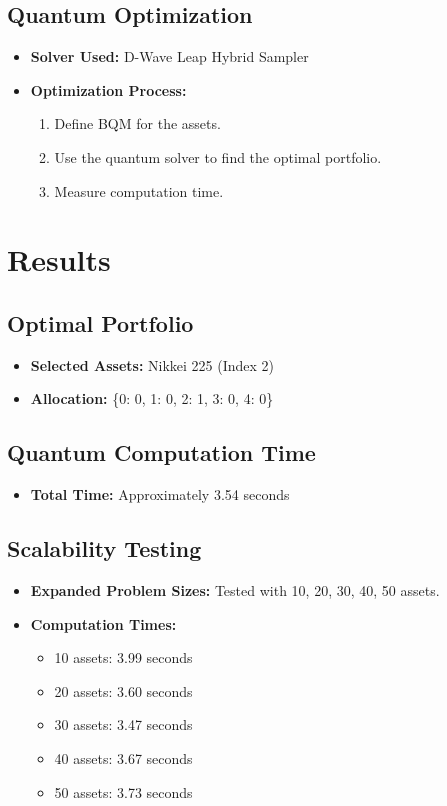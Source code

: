 \documentclass{article}
\begin{document}
\subsection{Quantum Optimization}
\begin{itemize}
    \item \textbf{Solver Used:} D-Wave Leap Hybrid Sampler
    \item \textbf{Optimization Process:}
        \begin{enumerate}
            \item Define BQM for the assets.
            \item Use the quantum solver to find the optimal portfolio.
            \item Measure computation time.
        \end{enumerate}
\end{itemize}

\section{Results}
\subsection{Optimal Portfolio}
\begin{itemize}
    \item \textbf{Selected Assets:} Nikkei 225 (Index 2)
    \item \textbf{Allocation:} \{0: 0, 1: 0, 2: 1, 3: 0, 4: 0\}
\end{itemize}

\subsection{Quantum Computation Time}
\begin{itemize}
    \item \textbf{Total Time:} Approximately 3.54 seconds
\end{itemize}

\subsection{Scalability Testing}
\begin{itemize}
    \item \textbf{Expanded Problem Sizes:} Tested with 10, 20, 30, 40, 50 assets.
    \item \textbf{Computation Times:}
    \begin{itemize}
        \item 10 assets: 3.99 seconds
        \item 20 assets: 3.60 seconds
        \item 30 assets: 3.47 seconds
        \item 40 assets: 3.67 seconds
        \item 50 assets: 3.73 seconds
    \end{itemize}
\end{itemize}
\end{document}
